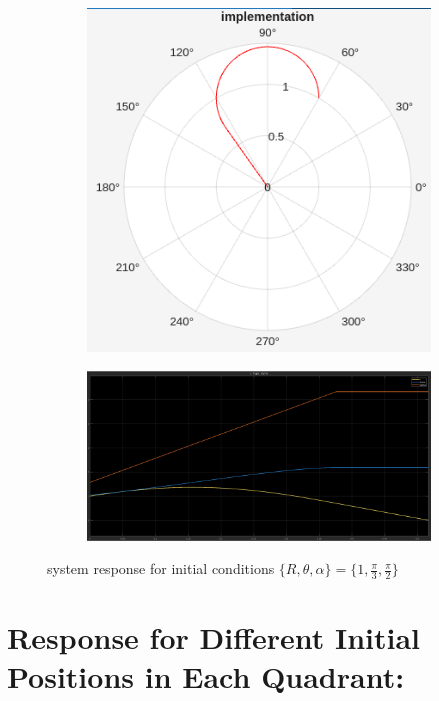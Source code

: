 \documentclass[12pt]{article}
\begin{document}
\begin{figure}[h]
    \centering
    \begin{subfigure}{.32\textwidth}
        \centering
        \includegraphics[width=0.9\linewidth]{images/implementplot.png}
    \end{subfigure}
    \begin{subfigure}{.65\textwidth}
        \centering
        \includegraphics[width=0.9\linewidth]{images/implementscope.png}
    \end{subfigure}
    \caption{system response for initial conditions \(\{R, \theta, \alpha\} = \{1, \frac{\pi}{3}, \frac{\pi}{2}\}\)}
\end{figure}

\pagebreak
\section{Response for Different Initial Positions in Each Quadrant:}
\end{document}
